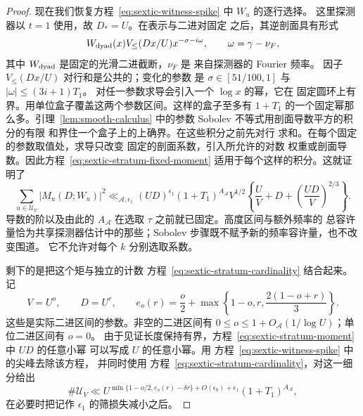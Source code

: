 \begin{proof}
现在我们恢复方程~\eqref{eq:sextic-witness-spike} 中 $W_u$ 的逐行选择。
这里探测器以 $t=1$ 使用，故 $D_*=U$。在表示与二进对固定
之后，其逆剖面具有形式
\[
 W_{\rm dyad}(x)V_{\le}(Dx/U)x^{-\sigma-i\omega},
 \qquad \omega=\gamma-\nu_F,
\]
其中 $W_{\rm dyad}$ 是固定的光滑二进截断，$\nu_F$ 是
来自探测器的 Fourier 频率。
因子 $V_{\le}(Dx/U)$ 对行和是公共的；变化的参数
是 $\sigma\in[51/100,1]$ 与 $|\omega|\le(3i+1)T_1$。
对任一参数求导会引入一个 $\log x$ 的幂，它在
固定圆环上有界。用单位盒子覆盖这两个参数区间。这样的盒子至多有
$1+T_1$ 的一个固定幂那么多。引理~\ref{lem:smooth-calculus} 中的参数 Sobolev
不等式用剖面导数平方的积分的有限
和界住一个盒子上的上确界。在这些积分之前先对行
求和。在每个固定的参数取值处，求导只改变
固定的剖面系数，引入所允许的对数
权重或剖面导数。因此方程~\eqref{eq:sextic-stratum-fixed-moment}
适用于每个这样的积分。这就证明了
\begin{equation}\label{eq:sextic-stratum-moment}
 \sum_{u\in\mathcal U_V}|M_u(D;W_u)|^2
 \ll_{\mathcal A,\epsilon_1}(UD)^{\epsilon_1}(1+T_1)^{A_{\mathcal A}}
 V^{1/2}\left\{\frac UV+D+
       \left(\frac{UD}{V}\right)^{2/3}\right\}.
\end{equation}
导数的阶以及由此的 $A_{\mathcal A}$ 在选取
$\tau$ 之前就已固定。高度区间与额外频率的
总容许量恰为共享探测器估计中的那些；Sobolev
步骤既不赋予新的频率容许量，也不改变围道。
它不允许对每个 $k$ 分别选取系数。

剩下的是把这个矩与独立的计数
方程~\eqref{eq:sextic-stratum-cardinality} 结合起来。记
\[
 V=U^o,\qquad D=U^r,\qquad
 e_o(r)=\frac o2+\max\left\{1-o,r,\frac{2(1-o+r)}3\right\}.
\]
这些是实际二进区间的参数。非空的二进区间有
$0\le o\le1+O_{\mathcal A}(1/\log U)$；单位二进区间有 $o=0$。
由于见证长度保持有界，方程~\eqref{eq:sextic-stratum-moment} 中 $UD$ 的任意小幂
可以写成 $U$ 的任意小幂。用
方程~\eqref{eq:sextic-witness-spike} 中的尖峰去除该方程，
并同时使用
方程~\eqref{eq:sextic-stratum-cardinality}，对这一细分给出
\begin{equation}\label{eq:sextic-stratum-envelope}
 \#\mathcal U_V
 \ll U^{\min\{1-o/2,e_o(r)-\delta r\}+O(\epsilon_0)+\epsilon_1}
       (1+T_1)^{A_{\mathcal A}},
\end{equation}
在必要时把记作 $\epsilon_1$ 的筛损失减小之后。


\end{proof}
